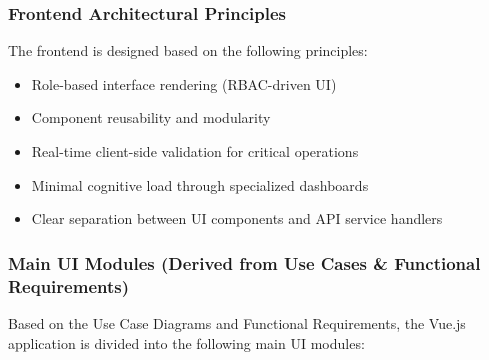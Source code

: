 \subsubsection{Frontend Architectural Principles}
The frontend is designed based on the following principles:
\begin{itemize}
	\item Role-based interface rendering (RBAC-driven UI)
	\item Component reusability and modularity
	\item Real-time client-side validation for critical operations
	\item Minimal cognitive load through specialized dashboards
	\item Clear separation between UI components and API service handlers
\end{itemize}

\subsubsection{Main UI Modules (Derived from Use Cases \& Functional Requirements)}
Based on the Use Case Diagrams and Functional Requirements, the Vue.js application is divided into the following main UI modules:

